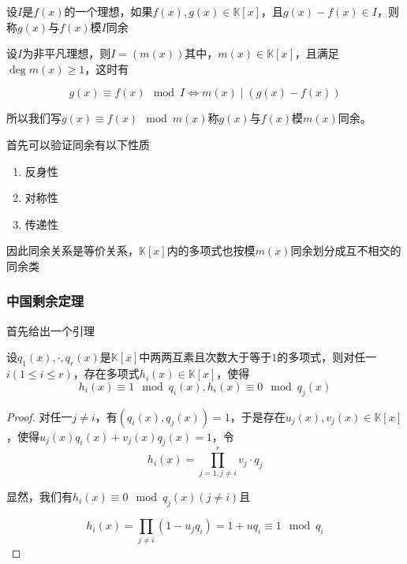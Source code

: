 \documentclass{ctexart}
\begin{document}
\begin{definition}
    设$I$是$f(x)$的一个理想，如果$f(x),g(x)\in \mathbb{K}[x]$，且$g(x) - f(x) \in I$，则称$g(x)$与$f(x)$模$I$同余

    设$I$为非平凡理想，则$I = (m(x))$其中，$m(x) \in \mathbb {K}[x]$，且满足$\deg m(x) \geq 1$，这时有

    \begin{equation*}
        g(x) \equiv f(x) \mod I \Leftrightarrow m(x) \mid (g(x) - f(x))
    \end{equation*}
    
    所以我们写$g(x) \equiv f(x) \mod m(x)$称$g(x)$与$f(x)$模$m(x)$同余。
\end{definition}

首先可以验证同余有以下性质
\begin{enumerate}
    \item 反身性
    \item 对称性
    \item 传递性
\end{enumerate}

因此同余关系是等价关系，$\mathbb{K}[x]$内的多项式也按模$m(x)$同余划分成互不相交的同余类

\subsubsection{中国剩余定理}

首先给出一个引理

\begin{lemma}
    设$q_1(x),\cdot,q_r(x)$是$\mathbb{K}[x]$中两两互素且次数大于等于$1$的多项式，则对任一$i(1\leq i \leq r)$，存在多项式$h_i(x) \in \mathbb{K}[x]$，使得
    \begin{equation*}
        h_i(x) \equiv 1 \mod q_i(x), h_i(x) \equiv 0 \mod q_j(x)
    \end{equation*}
\end{lemma}

\begin{proof}
    对任一$j \neq i$，有$(q_i(x),q_j(x)) = 1$，于是存在$u_j(x),v_j(x) \in \mathbb{K}[x]$，使得$u_j(x)q_i(x) + v_j(x)q_j(x) = 1$，令
    \begin{equation*}
        h_i(x) = \prod_{j = 1,j \neq i} ^{r} v_j \cdot q_j
    \end{equation*}
    
    显然，我们有$h_i(x) \equiv 0 \mod q_j(x) (j \neq i)$且

    \begin{equation*}
        h_i(x) = \prod_{j \neq i}(1 - u_j q_i) = 1 + u q_i \equiv 1 \mod q_i
    \end{equation*}
\end{proof}
\end{document}
